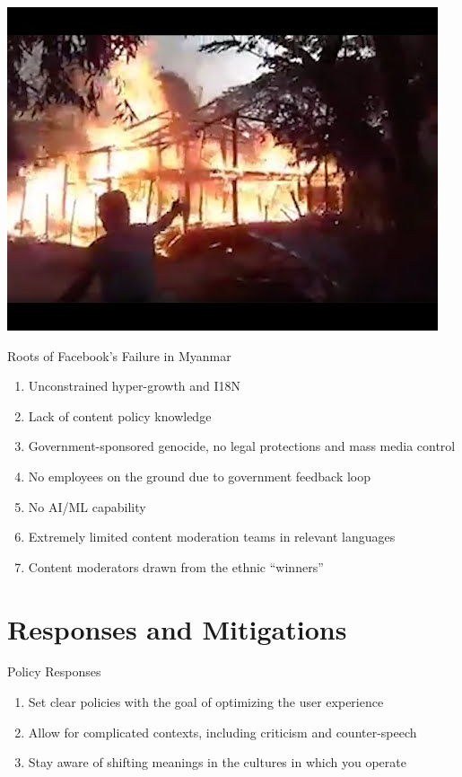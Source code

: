 \documentclass[nobackground,dvipsnames,table,aspectratio=169]{beamer}
\begin{document}
\begin{frame}{} 
    \href{https://youtu.be/wOTYwFr3cwU}{\includegraphics[width=\textwidth]{myanmar-homes-burning}}
\end{frame}

\begin{frame}{Roots of Facebook’s Failure in Myanmar}
    \large
    \begin{enumerate}
        \item Unconstrained hyper-growth and I18N
        \item Lack of content policy knowledge
        \item Government-sponsored genocide, no legal protections and mass media control
        \item No employees on the ground due to government feedback loop
        \item No AI/ML capability
        \item Extremely limited content moderation teams in relevant languages
        \item Content moderators drawn from the ethnic “winners”
    \end{enumerate}
\end{frame}

\section{Responses and Mitigations}

\begin{frame}{Policy Responses}
    \large
    \begin{enumerate}
        \item Set clear policies with the goal of optimizing the user experience
        \item Allow for complicated contexts, including criticism and counter-speech
        \item Stay aware of shifting meanings in the cultures in which you operate
    \end{enumerate}
\end{frame}
\end{document}
